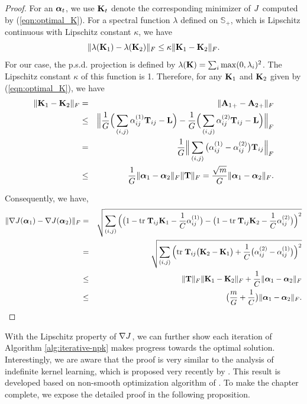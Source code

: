 \begin{proof}
For an ${\boldsymbol{\alpha}}_t$, we use ${\bf K}_t$ denote the corresponding minimizer of $J$ computed
by (\ref{eqn:optimal_K}). For a spectral function $\lambda$ defined on $\mathbb
S_+$, which is Lipschitz continuous with Lipschitz constant $\kappa$, we have
\[
\| \lambda({\bf K}_1) - \lambda({\bf K}_2) \|_F \leq \kappa\| {\bf K}_1 - {\bf K}_2 \|_F.
\]
For our case, the p.s.d. projection is defined by $\lambda({\bf K}) = \sum_i \max(0,
\lambda_i)^2$. The Lipschitz constant $\kappa$ of this function is 1. Therefore, for
any ${\bf K}_1$ and ${\bf K}_2$ given by (\ref{eqn:optimal_K}), we have
\begin{eqnarray}
\| {\bf K}_1 - {\bf K}_2 \|_F &=& \| {{\bf A}_1}_+ - {{\bf A}_2}_+ \|_F \nonumber \\
&\leq& \Big\| \frac{1}{G}\Big(\sum_{(i,j)}{\alpha}_{ij}^{(1)}  {\bf T}_{ij} - {\bf L}\Big) - \frac{1}{G}\Big(\sum_{(i,j)}{\alpha}_{ij}^{(2)}  {\bf T}_{ij} - {\bf L}\Big) \Big\|_F \nonumber\\
&=& \frac{1}{G} \Big\| \sum_{(i,j)}\big({\alpha}_{ij}^{(1)}- {\alpha}_{ij}^{(2)}\big) {\bf T}_{ij}    \Big\|_F \nonumber\\
&\leq& \frac{1}{G}\| {\boldsymbol{\alpha}}_1 - {\boldsymbol{\alpha}}_2\|_F \| {\bf T} \|_F
= \frac{\sqrt{m}}{G} \| {\boldsymbol{\alpha}}_1 - {\boldsymbol{\alpha}}_2 \|_F \nonumber .
\end{eqnarray}

Consequently, we have,
\begin{eqnarray}
\|\nabla J({\boldsymbol{\alpha}}_1) - \nabla J({\boldsymbol{\alpha}}_2)\|_F
&=& \sqrt{\sum_{(i,j)}\Big(\big(1-{\mbox{tr}\;}{\bf T}_{ij}{\bf K}_1-\frac{1}{C}{\alpha}_{ij}^{(1)}\big) - \big(1-{\mbox{tr}\;}{\bf T}_{ij}{\bf K}_2-\frac{1}{C}{\alpha}_{ij}^{(2)}\big)  \Big)^2} \nonumber\\
&=& \sqrt{\sum_{(i,j)}\Big({\mbox{tr}\;}{\bf T}_{ij}\big({\bf K}_2-{\bf K}_1\big)+\frac{1}{C}\big({\alpha}_{ij}^{(2)}-{\alpha}_{ij}^{(1)}\big)   \Big)^2} \nonumber\\
&\leq& \| {\bf T} \|_F \| {\bf K}_1 - {\bf K}_2 \|_F + \frac{1}{C} \| {\boldsymbol{\alpha}}_1 - {\boldsymbol{\alpha}}_2 \|_F \nonumber\\
&\leq& \big(\frac{m}{G}  + \frac{1}{C}\big) \| {\boldsymbol{\alpha}}_1 - {\boldsymbol{\alpha}}_2 \|_F \nonumber .
\end{eqnarray}
\end{proof}

With the Lipschitz property of $\nabla J$, we can further show each iteration of Algorithm \ref{alg:iterative-npk} makes progress towards the optimal solution. Interestingly, we are aware that the proof is very similar to the analysis of indefinite kernel learning, which is proposed very recently by \cite{nips/YingCG09}. This result is developed based on non-smooth optimization algorithm of \cite{mp/Nesterov05}. To make the chapter complete, we expose the detailed proof in the following proposition.


